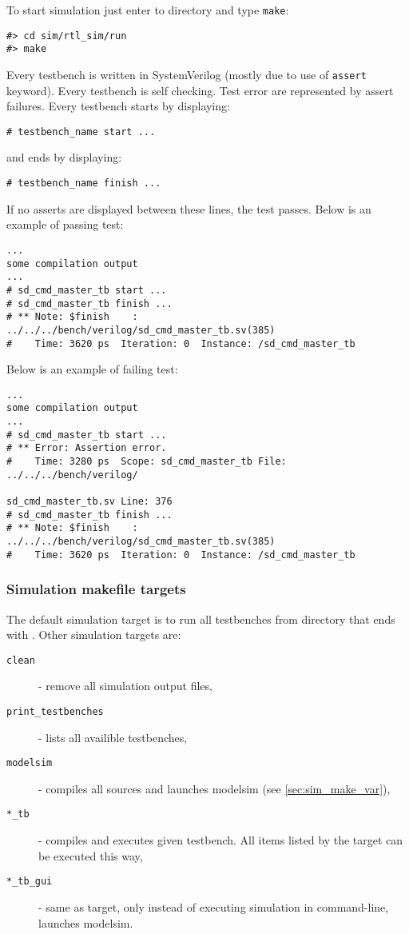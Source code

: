     To start simulation just enter to  directory and type \texttt{make}:
    \begin{verbatim}
#> cd sim/rtl_sim/run
#> make
    \end{verbatim}
    
    Every testbench is written in SystemVerilog (mostly due to use of \texttt{assert} keyword). Every testbench is self checking. Test error are represented by
    assert failures. Every testbench starts by displaying: 
    \begin{verbatim}
# testbench_name start ...
    \end{verbatim} 
    and ends by displaying:
    \begin{verbatim}
# testbench_name finish ...
    \end{verbatim} 
    If no asserts are displayed between these lines, the test passes. Below is an example of passing test:
    \begin{verbatim}
... 
some compilation output
...
# sd_cmd_master_tb start ...
# sd_cmd_master_tb finish ...
# ** Note: $finish    : ../../../bench/verilog/sd_cmd_master_tb.sv(385)
#    Time: 3620 ps  Iteration: 0  Instance: /sd_cmd_master_tb
    \end{verbatim}
    Below is an example of failing test:
    \begin{verbatim}
... 
some compilation output
...
# sd_cmd_master_tb start ...
# ** Error: Assertion error.
#    Time: 3280 ps  Scope: sd_cmd_master_tb File: ../../../bench/verilog/
                                                    sd_cmd_master_tb.sv Line: 376
# sd_cmd_master_tb finish ...
# ** Note: $finish    : ../../../bench/verilog/sd_cmd_master_tb.sv(385)
#    Time: 3620 ps  Iteration: 0  Instance: /sd_cmd_master_tb
    \end{verbatim}
    
    \subsubsection{Simulation makefile targets}
    \label{sec:sim_make_targ}

    The default simulation target is to run all testbenches from  directory that ends with . Other simulation targets are:
    \begin{description}
    \item[\texttt{clean}] - remove all simulation output files,
    \item[\texttt{print\_testbenches}] - lists all availible testbenches,
    \item[\texttt{modelsim}] - compiles all sources and launches modelsim (see \ref{sec:sim_make_var}),
    \item[\texttt{*\_tb}] - compiles and executes given testbench. All items listed by the  target can be executed this way,
    \item[\texttt{*\_tb\_gui}] - same as  target, only instead of executing simulation in command-line, launches modelsim.
    \end{description}
    
